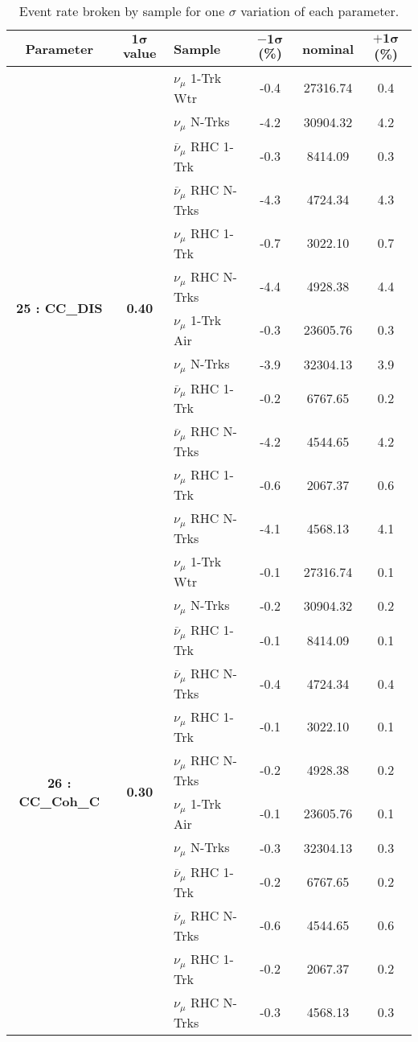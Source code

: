 \addtocounter{table}{-1}
\begin{table}[ht!]
\centering
\begin{tabular}{ c  c  l  c  c  c }
\midrule[1.3pt]
\textbf{Parameter} & \textbf{$\mathbf{1\sigma}$ value} & \textbf{Sample} & \textbf{$\mathbf{-1\sigma}$ (\%)}  &  \textbf{nominal}  &  \textbf{$\mathbf{+1\sigma}$ (\%)} \\
\midrule[1.3pt]
\multirow{12}{*}{\textbf{25 : CC\_DIS}} & \multirow{12}{*}{\textbf{0.40}} & $\nu_\mu$ 1-Trk Wtr &   -0.4 &  27316.74 &   0.4 \\ 
 &  & $\nu_\mu$ N-Trks &   -4.2 &  30904.32 &   4.2 \\ 
 &  & $\overline{\nu}_\mu$ RHC 1-Trk &   -0.3 &  8414.09 &   0.3 \\ 
 &  & $\overline{\nu}_\mu$ RHC N-Trks &   -4.3 &  4724.34 &   4.3 \\ 
 &  & $\nu_\mu$ RHC 1-Trk &   -0.7 &  3022.10 &   0.7 \\ 
 &  & $\nu_\mu$ RHC N-Trks &   -4.4 &  4928.38 &   4.4 \\ 
 &  & $\nu_\mu$ 1-Trk Air &   -0.3 &  23605.76 &   0.3 \\ 
 &  & $\nu_\mu$ N-Trks &   -3.9 &  32304.13 &   3.9 \\ 
 &  & $\overline{\nu}_\mu$ RHC 1-Trk &   -0.2 &  6767.65 &   0.2 \\ 
 &  & $\overline{\nu}_\mu$ RHC N-Trks &   -4.2 &  4544.65 &   4.2 \\ 
 &  & $\nu_\mu$ RHC 1-Trk &   -0.6 &  2067.37 &   0.6 \\ 
 &  & $\nu_\mu$ RHC N-Trks &   -4.1 &  4568.13 &   4.1 \\ 
\midrule[1.3pt]
\multirow{12}{*}{\textbf{26 : CC\_Coh\_C}} & \multirow{12}{*}{\textbf{0.30}} & $\nu_\mu$ 1-Trk Wtr &   -0.1 &  27316.74 &   0.1 \\ 
 &  & $\nu_\mu$ N-Trks &   -0.2 &  30904.32 &   0.2 \\ 
 &  & $\overline{\nu}_\mu$ RHC 1-Trk &   -0.1 &  8414.09 &   0.1 \\ 
 &  & $\overline{\nu}_\mu$ RHC N-Trks &   -0.4 &  4724.34 &   0.4 \\ 
 &  & $\nu_\mu$ RHC 1-Trk &   -0.1 &  3022.10 &   0.1 \\ 
 &  & $\nu_\mu$ RHC N-Trks &   -0.2 &  4928.38 &   0.2 \\ 
 &  & $\nu_\mu$ 1-Trk Air &   -0.1 &  23605.76 &   0.1 \\ 
 &  & $\nu_\mu$ N-Trks &   -0.3 &  32304.13 &   0.3 \\ 
 &  & $\overline{\nu}_\mu$ RHC 1-Trk &   -0.2 &  6767.65 &   0.2 \\ 
 &  & $\overline{\nu}_\mu$ RHC N-Trks &   -0.6 &  4544.65 &   0.6 \\ 
 &  & $\nu_\mu$ RHC 1-Trk &   -0.2 &  2067.37 &   0.2 \\ 
 &  & $\nu_\mu$ RHC N-Trks &   -0.3 &  4568.13 &   0.3 \\ 
\midrule[1.3pt]
\end{tabular}
\centering
\caption{Event rate broken by sample for one $\sigma$ variation of each parameter.}
\end{table}
